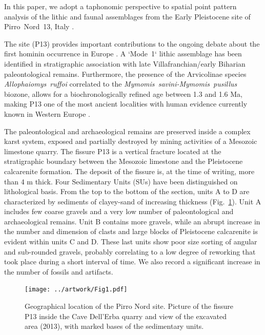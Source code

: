 \documentclass[5p,authoryear]{elsarticle} %
\begin{document}
In this paper, we adopt a taphonomic perspective to spatial point pattern analysis of the lithic and faunal assemblages from the Early Pleistocene site of Pirro~Nord~13, Italy \citep{Arzarello2007,Arzarello2009,Arzarello2012,Arzarello2010}.

The site (P13) provides important contributions to the ongoing debate about the first hominin occurrence in Europe \citep{Carbonell2008,Crochet2009,Despriee2006,Despriee2009,Despriee2010,Lumley1988,Pares2006,Toro-Moyano2011,Toro-Moyano2009,Toro-Moyano2013}. A `Mode~1` lithic assemblage has been identified in stratigraphic association with late Villafranchian/early Biharian paleontological remains. Furthermore, the presence of the Arvicolinae species \emph{Allophaiomys~ruffoi} correlated to the \emph{Mymomis~savini-Mymomis~pusillus} biozone, allows for a  biochronologically refined age between 1.3 and 1.6 Ma, making P13 one of the most ancient localities with human evidence currently known in Western Europe \citep{Lopez-Garcia2015}.

The paleontological and archaeological remains are preserved inside a complex karst system, exposed and partially destroyed by mining activities of a Mesozoic limestone quarry. The fissure P13 is a vertical fracture located at the stratigraphic boundary between the Mesozoic limestone and the Pleistocene calcarenite formation. The deposit of the fissure is, at the time of writing, more than 4 m thick. Four Sedimentary Units (SUs) have been distinguished on lithological basis. From the top to the bottom of the section, units A to D are characterized by sediments of clayey-sand of increasing thickness (Fig.~\ref{fig:1}). Unit A includes few coarse gravels and a very low number of paleontological and archaeological remains. Unit B contains more gravels, while an abrupt increase in the number and dimension of clasts and large blocks of Pleistocene calcarenite is evident within units C and D. These last units show poor size sorting of angular and sub-rounded gravels, probably correlating to a low degree of reworking that took place during a short interval of time. We also record a significant increase in the number of fossils and artifacts.

\begin{figure}[t]
  \centering
  \texttt{[image: ../artwork/Fig1.pdf]}
  \caption{Geographical location of the Pirro Nord site. Picture of the fissure P13 inside the Cave Dell'Erba quarry and view of the excavated area (2013), with marked bases of the sedimentary units.}
  \label{fig:1}
\end{figure}
\end{document}
